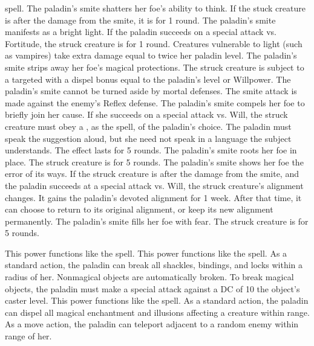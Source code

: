 spell.
The paladin's smite shatters her foe's ability to think.
If the stuck creature is \bloodied after the damage from the smite, it is \dazed for 1 round.
The paladin's smite manifests as a bright light.
If the paladin succeeds on a special attack vs. Fortitude, the struck creature is \blinded for 1 round.
Creatures vulnerable to light (such as vampires) take extra damage equal to twice her paladin level.
The paladin's smite strips away her foe's magical protections.
The struck creature is subject to a targeted  with a dispel bonus equal to the paladin's level or Willpower.
The paladin's smite cannot be turned aside by mortal defenses.
The smite attack is made against the enemy's Reflex defense.
The paladin's smite compels her foe to briefly join her cause.
If she succeeds on a special attack vs. Will, the struck creature must obey a , as the spell, of the paladin's choice.
The paladin must speak the suggestion aloud, but she need not speak in a language the subject understands.
The effect lasts for 5 rounds.
The paladin's smite roots her foe in place.
The struck creature is \immobilized for 5 rounds.
The paladin's smite shows her foe the error of its ways.
If the struck creature is \bloodied after the damage from the smite, and the paladin succeeds at a special attack vs. Will, the struck creature's alignment changes.
It gains the paladin's devoted alignment for 1 week.
After that time, it can choose to return to its original alignment, or keep its new alignment permanently.
The paladin's smite fills her foe with fear.
The struck creature is \frightened for 5 rounds.

 This power functions like the 
spell.
 This power functions like the 
spell.
As a standard action, the paladin can break all shackles, bindings, and locks within a \arealarge radius of her.
Nonmagical objects are automatically broken.
To break magical objects, the paladin must make a special attack against a DC of 10 \add the object's caster level.
 This power functions like the 
spell.
As a standard action, the paladin can dispel all magical enchantment and illusions affecting a creature within \rngmed range.
As a move action, the paladin can teleport adjacent to a random enemy within \rngmed range of her.

